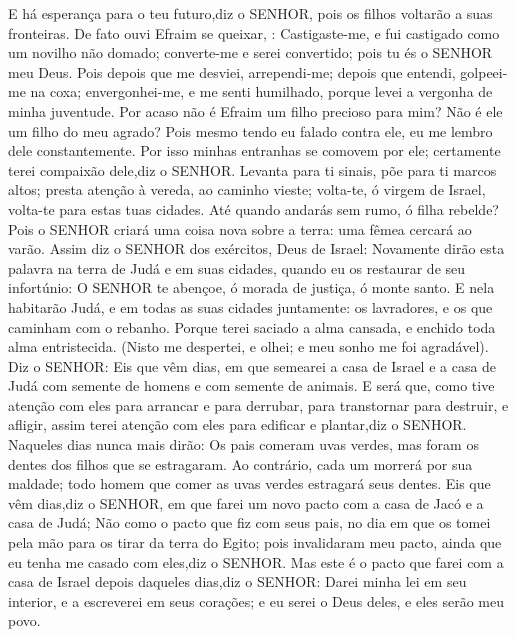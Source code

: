 {E há esperança para o teu futuro,diz o SENHOR, pois os
{} filhos voltarão a suas
{} fronteiras.
De fato ouvi Efraim se queixar,
{} : Castigaste-me, e fui castigado como um novilho não domado; converte-me e serei convertido; pois tu és o SENHOR meu Deus.
Pois depois que me desviei, arrependi-me; depois que entendi, golpeei-me na coxa; envergonhei-me, e me senti humilhado, porque levei a vergonha de minha juventude.
Por acaso não é Efraim um filho precioso para mim? Não é ele um filho do meu agrado? Pois mesmo tendo eu falado contra ele, eu me lembro dele constantemente. Por isso minhas entranhas se comovem por ele; certamente terei compaixão dele,diz o SENHOR.
Levanta para ti sinais, põe para ti marcos altos; presta atenção à vereda, ao caminho
{} vieste; volta-te, ó virgem de Israel, volta-te para estas tuas cidades.
Até quando andarás sem rumo, ó filha rebelde? Pois o SENHOR criará uma coisa nova sobre a terra: uma fêmea cercará
 ao varão.
Assim diz o SENHOR dos exércitos, Deus de Israel: Novamente dirão esta palavra na terra de Judá e em suas cidades, quando eu os restaurar de seu infortúnio: O SENHOR te abençoe, ó morada de justiça, ó monte santo.
E nela habitarão Judá, e em todas as suas cidades juntamente: os lavradores, e os que caminham com o rebanho.
Porque terei saciado a alma cansada, e enchido toda alma entristecida.
(Nisto me despertei, e olhei; e meu sonho me foi agradável).
Diz o SENHOR: Eis que vêm dias, em que semearei a casa de Israel e a casa de Judá com semente de homens e com semente de animais.
E será que, como tive atenção com eles para arrancar e para derrubar, para transtornar para destruir, e afligir, assim terei atenção com eles para edificar e plantar,diz o SENHOR.
Naqueles dias nunca mais dirão: Os pais comeram uvas verdes, mas foram os dentes dos filhos que se estragaram.
Ao contrário, cada um morrerá por sua
{} maldade; todo homem que comer as uvas verdes estragará seus dentes.
Eis que vêm dias,diz o SENHOR, em que farei um novo pacto com a casa de Jacó e a casa de Judá;
Não como o pacto que fiz com seus pais, no dia em que os tomei pela mão para os tirar da terra do Egito; pois invalidaram meu pacto, ainda que eu tenha me casado com eles,diz o SENHOR.
Mas este é o pacto que farei com a casa de Israel depois daqueles dias,diz o SENHOR: Darei minha lei em seu interior, e a escreverei em seus corações; e eu serei o Deus deles, e eles serão meu povo.
}
